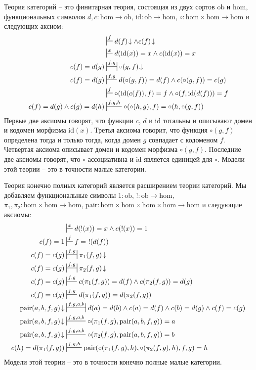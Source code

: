 \documentclass[reqno]{amsart}
\theoremstyle{definition}
\theoremstyle{remark}
\newcommand{\fs}[1]{\mathrm{#1}}
\begin{document}
\begin{example}
Теория категорий -- это финитарная теория, состоящая из двух сортов $\fs{ob}$ и $\fs{hom}$, функциональных символов $d,c : \fs{hom} \to \fs{ob}$, $\fs{id} : \fs{ob} \to \fs{hom}$, $\circ : \fs{hom} \times \fs{hom} \to \fs{hom}$ и следующих аксиом:
\begin{align*}
& \sststile{}{f} d(f)\!\downarrow \land c(f)\!\downarrow \\
& \sststile{}{x} d(\fs{id}(x)) = x \land c(\fs{id}(x)) = x \\
c(f) = d(g) & \ssststile{}{f,g} \circ(g,f)\!\downarrow \\
c(f) = d(g) & \sststile{}{f,g} d(\circ(g,f)) = d(f) \land c(\circ(g,f)) = c(g) \\
& \sststile{}{f} \circ(\fs{id}(c(f)),f) = f \land \circ(f,\fs{id}(d(f))) = f \\
c(f) = d(g) \land c(g) = d(h) & \sststile{}{f,g,h} \circ(\circ(h,g),f) = \circ(h,\circ(g,f))
\end{align*}
Первые две аксиомы говорят, что функции $c$, $d$ и $\fs{id}$ тотальны и описывают домен и кодомен морфизма $\fs{id}(x)$.
Третья аксиома говорит, что функция $\circ(g,f)$ определена тогда и только тогда, когда домен $g$ совпадает с кодоменом $f$.
Четвертая аксиома описывает домен и кодомен морфизма $\circ(g,f)$.
Последние две аксиомы говорят, что $\circ$ ассоциативна и $\fs{id}$ является единицей для $\circ$.
Модели этой теории -- это в точности малые категории.
\end{example}

\begin{example}[fc-cats]
Теория конечно полных категорий является расширением теории категорий.
Мы добавляем функциональные символы $1 : \fs{ob}$, $! : \fs{ob} \to \fs{hom}$, $\pi_1,\pi_2 : \fs{hom} \times \fs{hom} \to \fs{hom}$, $\fs{pair} : \fs{hom} \times \fs{hom} \times \fs{hom} \times \fs{hom} \to \fs{hom}$ и следующие аксиомы:
\begin{align*}
& \sststile{}{x} d(!(x)) = x \land c(!(x)) = 1 \\
c(f) = 1 & \sststile{}{f} f =\ !(d(f)) \\
c(f) = c(g) & \ssststile{}{f,g} \pi_1(f,g)\!\downarrow \\
c(f) = c(g) & \ssststile{}{f,g} \pi_2(f,g)\!\downarrow \\
c(f) = c(g) & \sststile{}{f,g} c(\pi_1(f,g)) = d(f) \land c(\pi_2(f,g)) = d(g) \\
c(f) = c(g) & \sststile{}{f,g} d(\pi_1(f,g)) = d(\pi_2(f,g)) \\
\fs{pair}(a,b,f,g)\!\downarrow & \ssststile{}{f,g,a,b} d(a) = d(b) \land c(a) = d(f) \land c(b) = d(g) \land c(f) = c(g) \\
\fs{pair}(a,b,f,g)\!\downarrow & \sststile{}{f,g,a,b} \circ(\pi_1(f,g),\fs{pair}(a,b,f,g)) = a \\
\fs{pair}(a,b,f,g)\!\downarrow & \sststile{}{f,g,a,b} \circ(\pi_2(f,g),\fs{pair}(a,b,f,g)) = b \\
c(h) = d(\pi_1(f,g)) & \sststile{}{f,g,h} \fs{pair}(\circ(\pi_1(f,g),h),\circ(\pi_2(f,g),h),f,g) = h
\end{align*}
Модели этой теории -- это в точности конечно полные малые категории.
\end{example}
\end{document}
